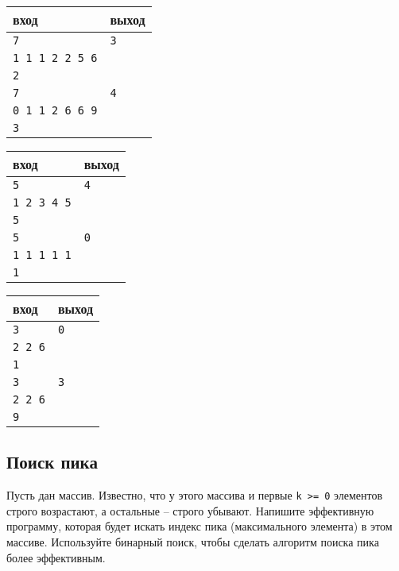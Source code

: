 \documentclass{article}
\begin{document}
\begin{multicols}{3}
\begin{center}
\begin{tabular}{ l | l }
 вход & выход \\ \hline
 \texttt{7} & \texttt{3}  \\  
 \texttt{1 1 1 2 2 5 6} & \\
 \texttt{2} & \\ \hline
 \texttt{7} & \texttt{4}  \\  
 \texttt{0 1 1 2 6 6 9} & \\
 \texttt{3} & \\ 
\end{tabular}
\end{center}

\begin{center}
\begin{tabular}{ l | l }
 вход & выход \\ \hline
 \texttt{5} & \texttt{4}  \\  
 \texttt{1 2 3 4 5} & \\
 \texttt{5} & \\ \hline
 \texttt{5} & \texttt{0}  \\  
 \texttt{1 1 1 1 1} & \\
 \texttt{1} & \\
\end{tabular}
\end{center}

\begin{center}
\begin{tabular}{ l | l }
 вход & выход \\ \hline
 \texttt{3} & \texttt{0}  \\  
 \texttt{2 2 6} & \\
 \texttt{1} & \\ \hline
 \texttt{3} & \texttt{3}  \\  
 \texttt{2 2 6} & \\
 \texttt{9} & \\
\end{tabular}
\end{center}
\end{multicols}



\subsection{Поиск пика}
Пусть дан массив. Известно, что у этого массива и первые \texttt{k >= 0} элементов строго возрастают, а остальные -- строго убывают. Напишите эффективную программу, которая будет искать индекс пика (максимального элемента) в этом массиве. Используйте
бинарный поиск, чтобы сделать алгоритм поиска пика более эффективным.
\end{document}
